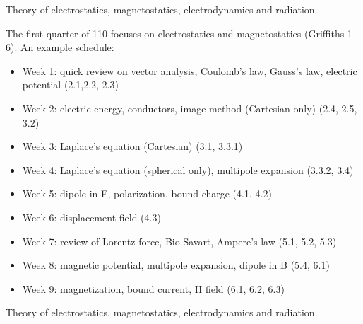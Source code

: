 \documentclass[12pt]{article}
\begin{document}



\newpage

\vskip 1cm
Theory of electrostatics, magnetostatics, electrodynamics and radiation.

The first quarter of 110 focuses on electrostatics and magnetostatics
(Griffiths 1-6).  An example schedule:
\begin{itemize}
\item Week 1: quick review on vector analysis, Coulomb’s law, Gauss’s law, electric potential (2.1,2.2, 2.3)
\item Week 2: electric energy, conductors, image method (Cartesian only) (2.4, 2.5, 3.2)
\item Week 3: Laplace’s equation (Cartesian) (3.1, 3.3.1)
\item Week 4: Laplace’s equation (spherical only), multipole expansion (3.3.2, 3.4)
\item Week 5: dipole in E, polarization, bound charge (4.1, 4.2)
\item Week 6: displacement field (4.3)
\item Week 7: review of Lorentz force, Bio-Savart, Ampere’s law (5.1, 5.2, 5.3)
\item Week 8: magnetic potential, multipole expansion, dipole in B (5.4, 6.1)
\item Week 9: magnetization, bound current, H field (6.1, 6.2, 6.3)
\end{itemize}

Theory of electrostatics, magnetostatics, electrodynamics and radiation.
\end{document}
